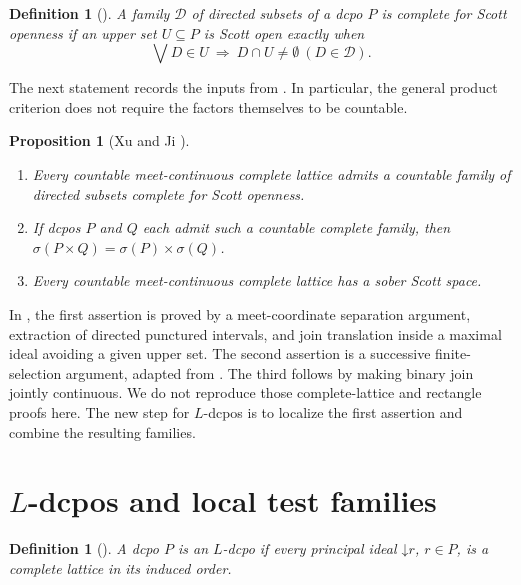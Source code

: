 \documentclass[10pt,a4paper]{amsart}
\newtheorem{proposition}[theorem]{Proposition}
\newtheorem{definition}[theorem]{Definition}
\numberwithin{equation}{section}
\newcommand{\down}[1]{\mathord{\downarrow}#1}
\newcommand{\Sc}{\sigma}
\begin{document}
\begin{definition}[{\cite[Section~4]{XuJi}}]\label{def:complete-tests}
A family $\mathcal D$ of directed subsets of a dcpo $P$ is \emph{complete for Scott openness} if an upper set $U\subseteq P$ is Scott open exactly when
\[
 \bigvee D\in U~\Longrightarrow~ D\cap U\ne\emptyset
 ~(D\in\mathcal D).
\]
\end{definition}

The next statement records the inputs from \cite[Theorem~1.1, Propositions~3.3 and~4.1]{XuJi}. In particular, the general product criterion does not require the factors themselves to be countable.

\begin{proposition}[Xu and Ji {\cite{XuJi}}]\label{prop:lattice-input}
\begin{enumerate}[label=\textup{(\arabic*)}]
\item Every countable meet-continuous complete lattice admits a countable family of directed subsets complete for Scott openness.
\item If dcpos $P$ and $Q$ each admit such a countable complete family, then $\Sc(P\times Q)=\Sc(P)\times\Sc(Q)$.
\item Every countable meet-continuous complete lattice has a sober Scott space.
\end{enumerate}
\end{proposition}

In \cite{XuJi}, the first assertion is proved by a meet-coordinate separation argument, extraction of directed punctured intervals, and join translation inside a maximal ideal avoiding a given upper set. The second assertion is a successive finite-selection argument, adapted from \cite[Lemma~4.1]{Miao}. The third follows by making binary join jointly continuous. We do not reproduce those complete-lattice and rectangle proofs here. The new step for $L$-dcpos is to localize the first assertion and combine the resulting families.

\section{\texorpdfstring{$L$}{L}-dcpos and local test families}\label{sec:local-tests}
\begin{definition}[{\cite[Definition~5.1]{JiaJungLi}}]\label{def:L-dcpo}
A dcpo $P$ is an \emph{$L$-dcpo} if every principal ideal $\down r$, $r\in P$, is a complete lattice in its induced order.
\end{definition}
\end{document}
